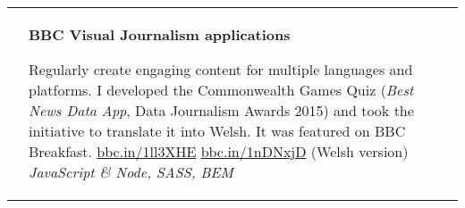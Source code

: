 \begin{tabular}{ p{21.4em} p{21.3em} }
&

\textbf{BBC Visual Journalism applications}
\par{Regularly create engaging content for multiple languages and platforms. I developed the Commonwealth Games Quiz (\emph{Best News Data App}, Data Journalism Awards 2015) and took the initiative to translate it into Welsh. It was featured on BBC Breakfast.
\newline
\url{bbc.in/1ll3XHE}
\newline
\url{bbc.in/1nDNxjD}} (Welsh version)
\newline
\emph{JavaScript \& Node, SASS, BEM}

\end{tabular}
